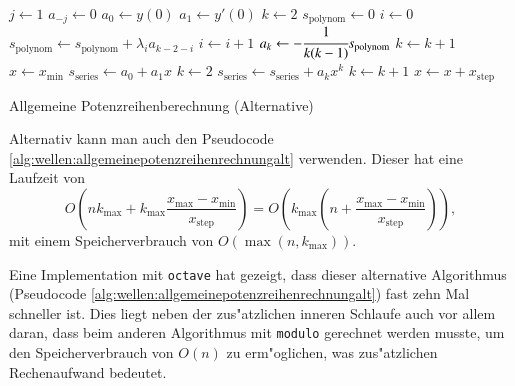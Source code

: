 \begin{algorithm}
	\begin{algorithmic}[1]
		\State $j \gets 1$
			\State $a_{-j} \gets 0$
		\EndFor
		\State $a_0 \gets y(0)$
		\State $a_1 \gets y'(0)$
		\State $k \gets 2$
			\State $s_{\text{polynom}} \gets 0$
			\State $i \gets 0$
				\State $s_{\text{polynom}} \gets s_{\text{polynom}}+\lambda_i 
				a_{k-2-i}$
				\State $i \gets i + 1$
			\EndFor
			\State $a_k \gets -\cfrac{1}{k(k-1)} s_{\text{polynom}}$
			\State $k \gets k + 1$
		\EndFor
		\State $x \gets x_{\text{min}}$
			\State $s_{\text{series}} \gets a_0 + a_1x$
			\State $k \gets 2$
				\State $s_{\text{series}} \gets s_{\text{series}} + a_k x^k$
				\State $k \gets k + 1$
			\EndFor
			\State $x \gets x + x_{\text{step}}$
		\EndFor
	\end{algorithmic}
	\caption{Allgemeine Potenzreihenberechnung (Alternative)} 
	\label{alg:wellen:allgemeinepotenzreihenrechnungalt}
\end{algorithm}
Alternativ kann man auch den Pseudocode 
\ref{alg:wellen:allgemeinepotenzreihenrechnungalt} verwenden. Dieser hat eine 
Laufzeit von
\begin{equation*}
	O
	\left(
		nk_{\text{max}} + k_{\text{max}} 
		\frac{x_{\text{max}}-x_{\text{min}}}{x_{\text{step}}}
	\right)
	=
	O
	\left(
		k_{\text{max}}
		\left(
			n+\frac{x_{\text{max}}-x_{\text{min}}}{x_{\text{step}}}
		\right)
	\right),
\end{equation*}
mit einem Speicherverbrauch von $O(\max(n, k_{\text{max}}))$.

Eine Implementation mit \texttt{octave} hat gezeigt, dass dieser alternative 
Algorithmus (Pseudocode \ref{alg:wellen:allgemeinepotenzreihenrechnungalt}) 
fast zehn Mal schneller ist. Dies liegt neben der zus"atzlichen inneren 
Schlaufe auch vor allem daran, dass beim anderen Algorithmus mit 
\texttt{modulo} gerechnet werden musste, um den Speicherverbrauch von $O(n)$ zu 
erm"oglichen, was zus"atzlichen Rechenaufwand bedeutet.
